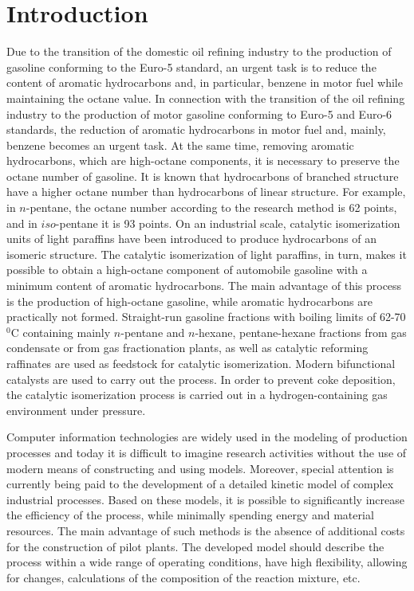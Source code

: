 \documentclass[mathematics,article,submit,pdftex,moreauthors]{Definitions/mdpi}
\begin{document}
\section{Introduction}

Due to the transition of the domestic oil refining industry to the production of gasoline conforming to the Euro-5 standard, an urgent task is to reduce the content of aromatic hydrocarbons and, in particular, benzene in motor fuel while maintaining the octane value. In connection with the transition of the oil refining industry to the production of motor gasoline conforming to Euro-5 and Euro-6 standards, the reduction of aromatic hydrocarbons in motor fuel and, mainly, benzene becomes an urgent task. At the same time, removing aromatic hydrocarbons, which are high-octane components, it is necessary to preserve the octane number of gasoline. It is known that hydrocarbons of branched structure have a higher octane number than hydrocarbons of linear structure. For example, in $n$-pentane, the octane number according to the research method is 62 points, and in $iso$-pentane it is 93 points. On an industrial scale, catalytic isomerization units of light paraffins have been introduced to produce hydrocarbons of an isomeric structure. The catalytic isomerization of light paraffins, in turn, makes it possible to obtain a high-octane component of automobile gasoline with a minimum content of aromatic hydrocarbons. The main advantage of this process is the production of high-octane gasoline, while aromatic hydrocarbons are practically not formed. Straight-run gasoline fractions with boiling limits of 62-70 $^0$C containing mainly $n$-pentane and $n$-hexane, pentane-hexane fractions from gas condensate or from gas fractionation plants, as well as catalytic reforming raffinates are used as feedstock for catalytic isomerization. Modern bifunctional catalysts are used to carry out the process. In order to prevent coke deposition, the catalytic isomerization process is carried out in a hydrogen-containing gas environment under pressure.

Computer information technologies are widely used in the modeling of production processes and today it is difficult to imagine research activities without the use of modern means of constructing and using models. Moreover, special attention is currently being paid to the development of a detailed kinetic model of complex industrial processes. Based on these models, it is possible to significantly increase the efficiency of the process, while minimally spending energy and material resources. The main advantage of such methods is the absence of additional costs for the construction of pilot plants. The developed model should describe the process within a wide range of operating conditions, have high flexibility, allowing for changes, calculations of the composition of the reaction mixture, etc.
\end{document}
